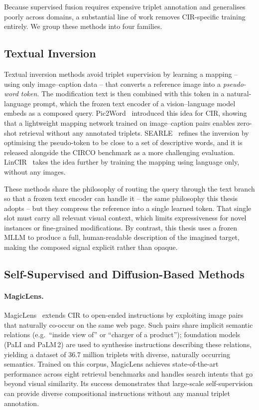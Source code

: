 Because supervised fusion requires expensive triplet annotation and generalises
poorly across domains, a substantial line of work removes CIR-specific training
entirely. We group these methods into four families.

\subsection{Textual Inversion}\label{sect:rel_textual_inv}

Textual inversion methods avoid triplet supervision by learning a mapping --
using only image--caption data -- that converts a reference image into a
\emph{pseudo-word token}. The modification text is then combined with this token
in a natural-language prompt, which the frozen text encoder of a
vision--language model embeds as a composed query.
Pic2Word~\cite{saito2023pic2word} introduced this idea for CIR, showing that a
lightweight mapping network trained on image--caption pairs enables zero-shot
retrieval without any annotated triplets. SEARLE~\cite{baldrati2023circo} refines
the inversion by optimising the pseudo-token to be close to a set of descriptive
words, and it is released alongside the CIRCO benchmark as a more challenging
evaluation. LinCIR~\cite{gu2024lincir} takes the idea further by training the
mapping using language only, without any images.

These methods share the philosophy of routing the query through the text branch
so that a frozen text encoder can handle it -- the same philosophy this thesis
adopts -- but they compress the reference into a single learned token. That
single slot must carry all relevant visual context, which limits expressiveness
for novel instances or fine-grained modifications. By contrast, this thesis uses
a frozen MLLM to produce a full, human-readable description of the imagined
target, making the composed signal explicit rather than opaque.

\subsection{Self-Supervised and Diffusion-Based Methods}\label{sect:rel_generative}

\paragraph{MagicLens.}
MagicLens~\cite{zhang2024magiclens} extends CIR to open-ended instructions by
exploiting image pairs that naturally co-occur on the same web page. Such pairs
share implicit semantic relations (e.g.\ ``inside view of'' or ``charger of a
product''); foundation models (PaLI and PaLM\,2) are used to synthesise
instructions describing these relations, yielding a dataset of 36.7 million
triplets with diverse, naturally occurring semantics. Trained on this corpus,
MagicLens achieves state-of-the-art performance across eight retrieval
benchmarks and handles search intents that go beyond visual similarity.
Its success demonstrates that large-scale self-supervision can provide
diverse compositional instructions without any manual triplet annotation.


